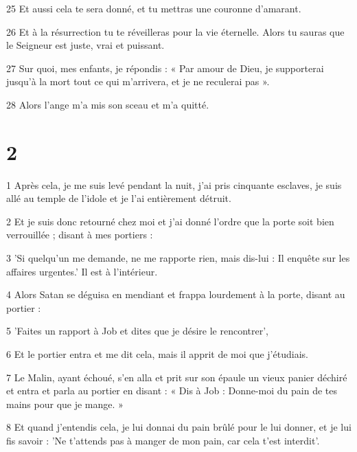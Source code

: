 \par 25 Et aussi cela te sera donné, et tu mettras une couronne d'amarant.

\par 26 Et à la résurrection tu te réveilleras pour la vie éternelle. Alors tu sauras que le Seigneur est juste, vrai et puissant.

\par 27 Sur quoi, mes enfants, je répondis : « Par amour de Dieu, je supporterai jusqu'à la mort tout ce qui m'arrivera, et je ne reculerai pas ».

\par 28 Alors l'ange m'a mis son sceau et m'a quitté.

\chapter{2}

\par 1 Après cela, je me suis levé pendant la nuit, j'ai pris cinquante esclaves, je suis allé au temple de l'idole et je l'ai entièrement détruit.

\par 2 Et je suis donc retourné chez moi et j'ai donné l'ordre que la porte soit bien verrouillée ; disant à mes portiers :

\par 3 'Si quelqu'un me demande, ne me rapporte rien, mais dis-lui : Il enquête sur les affaires urgentes.' Il est à l'intérieur.

\par 4 Alors Satan se déguisa en mendiant et frappa lourdement à la porte, disant au portier :

\par 5 'Faites un rapport à Job et dites que je désire le rencontrer',

\par 6 Et le portier entra et me dit cela, mais il apprit de moi que j'étudiais.

\par 7 Le Malin, ayant échoué, s'en alla et prit sur son épaule un vieux panier déchiré et entra et parla au portier en disant : « Dis à Job : Donne-moi du pain de tes mains pour que je mange. »

\par 8 Et quand j'entendis cela, je lui donnai du pain brûlé pour le lui donner, et je lui fis savoir : 'Ne t'attends pas à manger de mon pain, car cela t'est interdit'.

